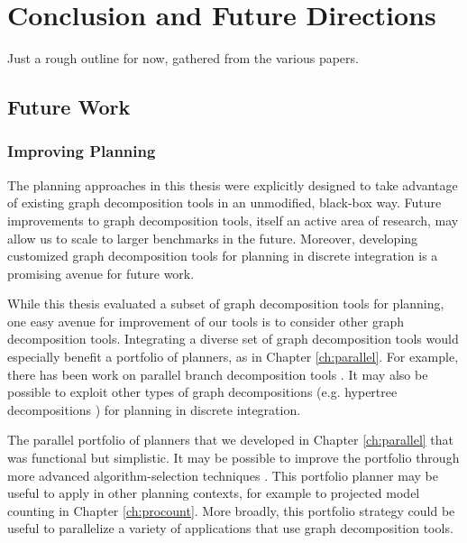 \chapter{Conclusion and Future Directions}
\label{ch:conclusion}
Just a rough outline for now, gathered from the various papers.

\section{Future Work}



\subsection{Improving Planning}
The planning approaches in this thesis were explicitly designed to take advantage of existing graph decomposition tools in an unmodified, black-box way.
Future improvements to graph decomposition tools, itself an active area of research, may allow us to scale to larger benchmarks in the future.
Moreover, developing customized graph decomposition tools for planning in discrete integration is a promising avenue for future work.

While this thesis evaluated a subset of graph decomposition tools for planning, one easy avenue for improvement of our tools is to consider other graph decomposition tools.
Integrating a diverse set of graph decomposition tools would especially benefit a portfolio of planners, as in Chapter \ref{ch:parallel}.
For example, there has been work on parallel branch decomposition tools \cite{hicks2000branch}.
It may also be possible to exploit other types of graph decompositions (e.g. hypertree decompositions \cite{AGG07}) for planning in discrete integration.

The parallel portfolio of planners that we developed in Chapter \ref{ch:parallel} that was functional but simplistic.
It may be possible to improve the portfolio through more advanced algorithm-selection techniques \cite{HHLKS09,XHHL12}. 
This portfolio planner may be useful to apply in other planning contexts, for example to projected model counting in Chapter \ref{ch:procount}.
More broadly, this portfolio strategy could be useful to parallelize a variety of applications that use graph decomposition tools.


